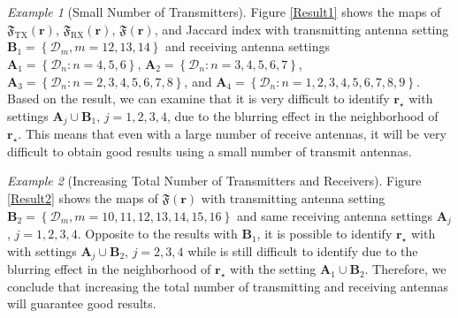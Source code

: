 \documentclass[3p,10pt]{elsarticle}
\newcommand{\set}[1]{\left\{#1\right\}}
\newcommand{\md}{\mathbf{d}}
\newcommand{\mr}{\mathbf{r}}
\DeclareMathOperator*{\tx}{TX}
\DeclareMathOperator*{\rx}{RX}
\theoremstyle{plain}
\theoremstyle{remark}
\newtheorem{example}{Example}[section]
\begin{document}

\begin{example}[Small Number of Transmitters]\label{ex1}
Figure \ref{Result1} shows the maps of $\mathfrak{F}_{\tx}(\mr)$, $\mathfrak{F}_{\rx}(\mr)$, $\mathfrak{F}(\mr)$, and Jaccard index with transmitting antenna setting $\mathbf{B}_1=\set{\mathcal{D}_m,m=12,13,14}$ and receiving antenna settings $\mathbf{A}_1=\set{\mathcal{D}_n:n=4,5,6}$, $\mathbf{A}_2=\set{\mathcal{D}_n:n=3,4,5,6,7}$, $\mathbf{A}_3=\set{\mathcal{D}_n:n=2,3,4,5,6,7,8}$, and $\mathbf{A}_4=\set{\mathcal{D}_n:n=1,2,3,4,5,6,7,8,9}$. Based on the result, we can examine that it is very difficult to identify $\mr_\star$ with settings $\mathbf{A}_j\cup\mathbf{B}_1$, $j=1,2,3,4$, due to the blurring effect in the neighborhood of $\mr_\star$. This means that even with a large number of receive antennas, it will be very difficult to obtain good results using a small number of transmit antennas.
\end{example}

\begin{example}[Increasing Total Number of Transmitters and Receivers]\label{ex2}
Figure \ref{Result2} shows the maps of $\mathfrak{F}(\mr)$ with transmitting antenna setting $\mathbf{B}_2=\set{\mathcal{D}_m,m=10,11,12,13,14,15,16}$ and same receiving antenna settings $\mathbf{A}_j$, $j=1,2,3,4$. Opposite to the results with $\mathbf{B}_1$, it is possible to identify $\mr_\star$ with with settings $\mathbf{A}_j\cup\mathbf{B}_2$, $j=2,3,4$ while is still difficult to identify due to the blurring effect in the neighborhood of $\mr_\star$ with the setting $\mathbf{A}_1\cup\mathbf{B}_2$. Therefore, we conclude that increasing the total number of transmitting and receiving antennas will guarantee good results.
\end{example}
\end{document}
